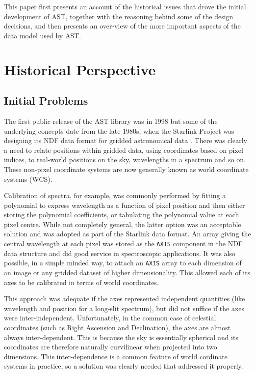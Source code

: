 \documentclass[final,authoryear,5p,times,twocolumn]{elsarticle}
\begin{document}
This paper first presents an account of the historical issues that drove
the initial development of AST, together with the reasoning behind some
of the design decisions, and then presents an over-view of the more
important aspects of the data model used by AST.

\section{Historical Perspective}

\subsection{Initial Problems}

The first public release of the AST library was in 1998
\citep{1998StarB..20....6L,1998StarB..20....7D} but some of the
underlying concepts date from the late 1980s, when the Starlink
Project was designing its NDF data format for gridded astronomical
data \citep{2015Jenness}. There was clearly a need to relate positions
within gridded data, using coordinates based on pixel indices, to
real-world positions on the sky, wavelengths in a spectrum and so
on. These non-pixel coordinate systems are now generally known as
world coordinate systems (WCS).

Calibration of spectra, for example, was commonly performed by fitting
a polynomial to express wavelength as a function of pixel position and
then either storing the polynomial coefficients, or tabulating the
polynomial value at each pixel centre. While not completely general,
the latter option was an acceptable solution and was adopted as part
of the Starlink data format. An array giving the central wavelength at
each pixel was stored as the \texttt{AXIS} component in the NDF data
structure and did good service in spectroscopic applications. It was
also possible, in a simple minded way, to attach an \texttt{AXIS}
array to each dimension of an image or any gridded dataset of higher
dimensionality. This allowed each of its axes to be calibrated in
terms of world coordinates.

This approach was adequate if the axes represented independent
quantities (like wavelength and position for a long-slit spectrum),
but did not suffice if the axes were inter-independent. Unfortunately,
in the common case of celestial coordinates (such as Right Ascension
and Declination), the axes are almost always inter-dependent. This is
because the sky is essentially spherical and its coordinates are
therefore naturally curvilinear when projected into two
dimensions. This inter-dependence is a common feature of world
cordinate systems in practice, so a solution was clearly needed that
addressed it properly.
\end{document}
